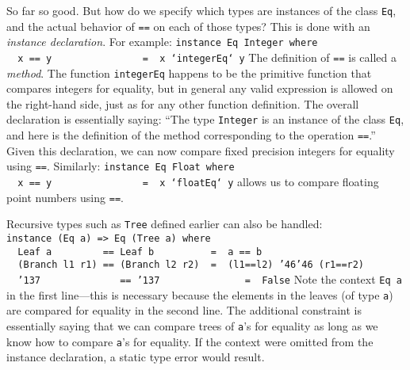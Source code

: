 So far so good.  But how do we specify which types are instances of
the class \mbox{\tt Eq}, and the actual behavior of \mbox{\tt ==} on each of those
types?  This is done with an {\em instance declaration}.  For example:
\bprog
\mbox{\tt instance\ Eq\ Integer\ where\ }\\
\mbox{\tt \ \ x\ ==\ y\ \ \ \ \ \ \ \ \ \ \ \ \ \ \ \ =\ \ x\ `integerEq`\ y}
\eprog
The definition of \mbox{\tt ==} is called a {\em method}.  The function \mbox{\tt integerEq}
happens to 
be the primitive function that compares integers for equality, but in
general any valid expression is allowed on the right-hand side, just
as for any other function definition.  The overall declaration is
essentially saying: ``The type \mbox{\tt Integer} is an instance of the class \mbox{\tt Eq},
and here is the definition of the method corresponding to the
operation \mbox{\tt ==}.''  Given this declaration, we can now compare fixed
precision integers for equality using \mbox{\tt ==}.  Similarly:
\bprog
\mbox{\tt instance\ Eq\ Float\ where}\\
\mbox{\tt \ \ x\ ==\ y\ \ \ \ \ \ \ \ \ \ \ \ \ \ \ \ =\ \ x\ `floatEq`\ y}
\eprog
allows us to compare floating point numbers using \mbox{\tt ==}.

Recursive types such as \mbox{\tt Tree} defined earlier can also be handled:
\bprog
\mbox{\tt instance\ (Eq\ a)\ =>\ Eq\ (Tree\ a)\ where\ }\\
\mbox{\tt \ \ Leaf\ a\ \ \ \ \ \ \ \ \ ==\ Leaf\ b\ \ \ \ \ \ \ \ \ \ =\ \ a\ ==\ b}\\
\mbox{\tt \ \ (Branch\ l1\ r1)\ ==\ (Branch\ l2\ r2)\ \ =\ \ (l1==l2)\ {\char'46}{\char'46}\ (r1==r2)}\\
\mbox{\tt \ \ {\char'137}\ \ \ \ \ \ \ \ \ \ \ \ \ \ ==\ {\char'137}\ \ \ \ \ \ \ \ \ \ \ \ \ \ \ =\ \ False}
\eprog
Note the context \mbox{\tt Eq\ a} in the first line---this is necessary because
the elements in the leaves (of type \mbox{\tt a}) are compared for equality in
the second line.  The additional constraint is essentially saying that we can
compare trees of \mbox{\tt a}'s for equality as long as we know how to compare
\mbox{\tt a}'s for equality.  If the context were omitted from the instance
declaration, a static type error would result.

